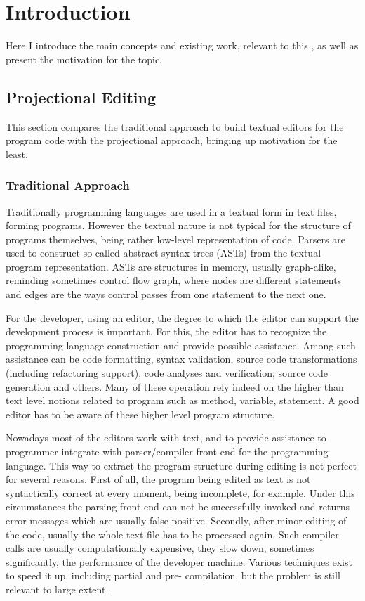 \chapter{Introduction}

Here I introduce the main concepts and existing work, relevant to this \MT, as well as present the motivation for the topic.
 
\section{Projectional Editing}

This section compares the traditional approach to build textual editors for the program code with
the projectional approach, bringing up  motivation for the least.

\subsection{Traditional Approach}
Traditionally programming languages are used in a textual form in text files, forming programs.
However the textual nature is not typical for the structure of programs themselves, being rather low-level
representation of code. Parsers are used to construct so called abstract syntax trees (ASTs) from the textual 
program representation. ASTs are structures in memory, usually graph-alike, reminding sometimes control flow
graph, where nodes are different statements and edges are the ways control passes from one statement to the 
next one.

For the developer, using an editor, the degree to which the editor can support the development process is 
important. For this, the editor has to recognize the programming language construction and provide possible assistance.
Among such assistance can be code formatting, syntax validation, source code transformations (including refactoring support), code analyses and verification, 
source code generation and others. Many of these operation rely indeed on the higher than text level notions related to program such as method,
variable, statement. A good editor has to be aware of these higher level program structure.

Nowadays most of the editors work with text, and to provide assistance to programmer integrate with parser/compiler front-end 
for the programming language. This way to extract the program structure during editing is not perfect for several reasons.
First of all, the program being edited as text is not syntactically correct at every moment, being incomplete, for 
example. Under this circumstances the parsing front-end can not be successfully invoked and returns error messages
which are usually false-positive. Secondly, after minor editing of the code, usually the whole text file has to be
processed again. Such compiler calls are usually computationally expensive, they slow down, sometimes significantly, 
the performance of the developer machine. Various techniques exist to speed it up, including partial and pre- compilation,
but the problem is still relevant to large extent. 

